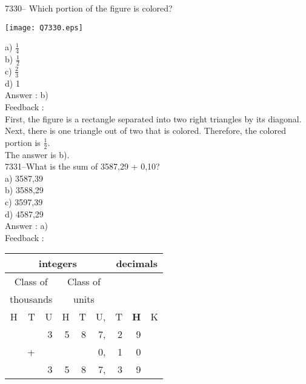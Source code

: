 \documentclass[letterpaper, 12pt]{article}
\begin{document}
7330-- Which portion of the figure is colored?\\

\begin{center}
\texttt{[image: Q7330.eps]}
\end{center}

a) $\frac{1}{4}$\\

b) $\frac{1}{2}$\\

c) $\frac{2}{3}$\\

d) 1\\

Answer : b)\\

Feedback :\\
First, the figure is a rectangle separated into two right triangles by its diagonal. Next, there is one triangle out of two that is colored. Therefore, the colored portion is $\frac{1}{2}$.\\
The answer is b).\\


7331--What is the sum of 3587,29 + 0,10?\\

a) 3587,39\\
b) 3588,29\\
c) 3597,39\\
d) 4587,29\\

Answer : a)\\

Feedback :\\
\begin{center}
\begin{tabular}{|rrr|rrr|rrr|}
\hline
\multicolumn{6}{|c|}{integers} &\multicolumn{3}{|c|}{decimals} \\
\hline
\multicolumn{3}{|c|}{Class of} &\multicolumn{3}{|c|}{Class of} &  \multicolumn{3}{c|}{} \\
\multicolumn{3}{|c|}{thousands} &\multicolumn{3}{|c|}{units} &  \multicolumn{3}{c|}{} \\
\hline
H & T & U &H & T & U, & T\up{th} & \textbf{H\up{th}} & K\up{th} \\
\hline
\hline
&  & 3 & 5 & 8 & 7, & 2 & 9 &  \\
 & + &  &  &  & 0, & 1 & 0 &  \\
\hline
\hline
 &  & 3 & 5 & 8 & 7, & 3 & 9 &  \\
\hline
\end{tabular}
\end{center}
\end{document}
